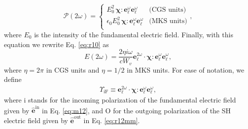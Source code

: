 \begin{equation}\label{eq:m4}
\boldsymbol{\mathcal{P}}(2\omega) = 
\left\{
\begin{array}{cc}  
E^{2}_{0}\,
\boldsymbol{\chi}:\mathbf{e}^{\omega}_{\ell}\mathbf{e}^{\omega}_{\ell}
& \text{(CGS units)}\\
\epsilon_{0}E^{2}_{0}\,
\boldsymbol{\chi}:\mathbf{e}^{\omega}_{\ell}\mathbf{e}^{\omega}_{\ell}
& \text{(MKS units)}\\
\end{array}
\right.,
\end{equation}
where $E_{0}$ is the intensity of the fundamental electric field. Finally, with
this equation we rewrite Eq. \eqref{eq:r10} as
\begin{equation}\label{eq:mr10}
E(2\omega) 
= \frac{2\eta i \omega}{cW_{v}}
\mathbf{e}^{2\omega}_{\ell}\cdot
\boldsymbol{\chi}:\mathbf{e}^{\omega}_{\ell}\mathbf{e}^{\omega}_{\ell},
\end{equation}
where $\eta=2\pi$ in CGS units and $\eta=1/2$ in MKS units. For ease of
notation, we define
\begin{align}\label{eq:mc0}
\Upsilon_{\mathrm{iF}}
\equiv 
\mathbf{e}^{2\omega}_{\ell}\cdot
\boldsymbol{\chi}:\mathbf{e}^{\omega}_{\ell}\mathbf{e}^{\omega}_{\ell},
\end{align}
where i stands for the incoming polarization of the fundamental electric field
given by $\hat{\mathbf{e}}^{\mathrm{in}}$ in Eq. \eqref{eq:m12}, and O for the
outgoing polarization of the SH electric field given by
$\hat{\mathbf{e}}^{\mathrm{out}}$ in Eq. \eqref{eq:r12mm}.

